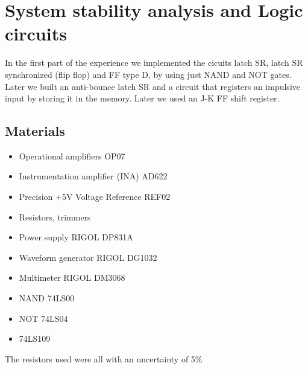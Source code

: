 \chapter{System stability analysis and Logic circuits}
In the first  part of the experience we implemented the cicuits latch SR, latch SR synchronized (flip flop) and FF type D, by using just NAND and NOT gates. Later we built an anti-bounce latch SR and a circuit that registers an impulsive input by storing it in the memory. Later we used an J-K FF shift register.

\section{Materials}
\begin{itemize}
\item Operational amplifiers OP07
\item Instrumentation amplifier (INA) AD622
\item Precision +5V Voltage Reference REF02
\item Resistors, trimmers
\item Power supply RIGOL DP831A
\item Waveform generator RIGOL DG1032
\item Multimeter RIGOL DM3068
\item NAND 74LS00
\item NOT 74LS04
\item 74LS109 
\end{itemize}
The resistors used were all with an uncertainty of 5\%

